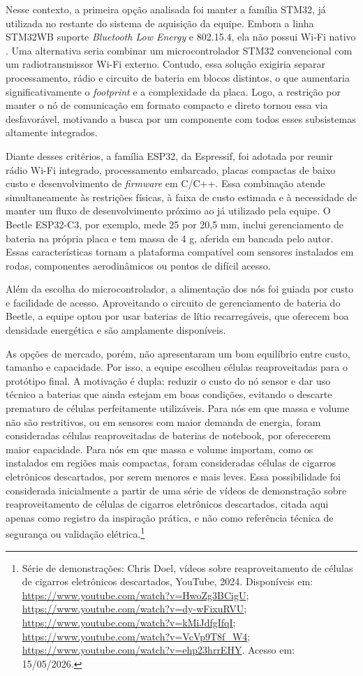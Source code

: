 Nesse contexto, a primeira opção analisada foi manter a família STM32, já utilizada no restante do sistema de aquisição da equipe. Embora a linha STM32WB suporte \emph{Bluetooth Low Energy} e 802.15.4, ela não possui Wi-Fi nativo \cite{st_stm32wb_series}. Uma alternativa seria combinar um microcontrolador STM32 convencional com um radiotransmissor Wi-Fi externo. Contudo, essa solução exigiria separar processamento, rádio e circuito de bateria em blocos distintos, o que aumentaria significativamente o \emph{footprint} e a complexidade da placa. Logo, a restrição por manter o nó de comunicação em formato compacto e direto tornou essa via desfavorável, motivando a busca por um componente com todos esses subsistemas altamente integrados.

Diante desses critérios, a família ESP32, da Espressif, foi adotada por reunir
rádio Wi-Fi integrado, processamento embarcado, placas compactas de baixo custo e
desenvolvimento de \emph{firmware} em C/C++. Essa
combinação atende simultaneamente às restrições físicas, à faixa de custo
estimada e à necessidade de manter um fluxo de desenvolvimento próximo ao já
utilizado pela equipe. O Beetle ESP32-C3, por exemplo, mede
25 por 20,5 mm, inclui gerenciamento de bateria na própria placa \cite{dfrobot_beetle_esp32c3} e tem
massa de 4 g, aferida em bancada pelo autor. Essas características tornam a
plataforma compatível com sensores instalados em rodas, componentes aerodinâmicos
ou pontos de difícil acesso.

Além da escolha do microcontrolador, a alimentação dos nós foi guiada por custo e 
facilidade de acesso. Aproveitando o circuito de gerenciamento de bateria do Beetle, 
a equipe optou por usar baterias de lítio recarregáveis, que oferecem boa densidade 
energética e são amplamente disponíveis.

As opções de mercado, porém, não apresentaram um bom equilíbrio entre custo, tamanho
e capacidade. Por isso, a equipe escolheu células reaproveitadas
para o protótipo final. A motivação é dupla: reduzir o custo do nó sensor e dar uso técnico a baterias
que ainda estejam em boas condições, evitando o descarte prematuro de células
perfeitamente utilizáveis. Para nós em que massa e volume não são restritivos,
ou em sensores com maior demanda de energia, foram consideradas células
reaproveitadas de baterias de notebook, por oferecerem maior capacidade. Para nós
em que massa e volume importam, como os instalados em regiões mais compactas,
foram consideradas células de cigarros eletrônicos descartados, por serem menores
e mais leves. Essa possibilidade foi considerada inicialmente a partir de uma série de vídeos de
demonstração sobre reaproveitamento de células de cigarros eletrônicos
descartados, citada aqui apenas como registro da inspiração prática, e não como
referência técnica de segurança ou validação elétrica.\footnote{Série de
demonstrações: Chris Doel, vídeos sobre reaproveitamento de células de cigarros
eletrônicos descartados, YouTube, 2024. Disponíveis em: \url{https://www.youtube.com/watch?v=HwoZg3BCigU}; \url{https://www.youtube.com/watch?v=dy-wFixuRVU}; \url{https://www.youtube.com/watch?v=kMiJdfgIfqI}; \url{https://www.youtube.com/watch?v=VcVp9T8f_W4}; \url{https://www.youtube.com/watch?v=ehp23hrrEHY}. Acesso em: 15/05/2026.}

